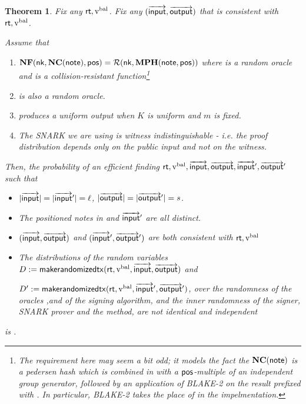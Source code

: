 \documentclass[11pt]{article}
\numberwithin{equation}{section} %
\numberwithin{figure}{section} %
\newtheorem{thm}{Theorem}[section]
\begin{document}
\begin{thm}\label{thm:indist-sapling}
Fix any $\mathsf{rt},\mathrm{v^{bal}}$.
Fix any $(\overrightarrow{\mathsf{input}},\overrightarrow{\mathsf{output}})$ that is consistent with $\mathsf{rt},\mathrm{v^{bal}}$.

Assume that 
\begin{enumerate}
 \item 
$\mathbf{NF}(\mathsf{nk},\mathbf{NC}(\mathsf{note}),\mathsf{pos})= \mathcal R(\mathsf{nk},\mathbf{MPH}(\mathsf{note},\mathsf{pos}))$ where \RO is a random oracle and \MPH is a collision-resistant function\footnote{The requirement here may seem a bit odd; it models the fact the $\mathbf{NC}(\mathsf{note})$ is a pedersen hash which is combined in \NF with a $\mathsf{pos}$-multiple of an independent group generator, followed by an application of BLAKE-2 on the result prefixed with \nk. In particular, BLAKE-2 takes the place of \RO in the impelmentation.}

\item
\KDF is also a random oracle.
\item {} produces a uniform output when $K$ is uniform and $m$ is fixed.
\item The SNARK we are using is witness indistinguishable - i.e. the proof distribution depends \emph{only} on the public input and not on the witness.
\end{enumerate}


Then, the probability of an efficient \adv finding $\mathsf{rt},\mathrm{v^{bal}},\overrightarrow{\mathsf{input}},\overrightarrow{\mathsf{output}},\overrightarrow{\mathsf{input}}',\overrightarrow{\mathsf{output}}'$
such that
\begin{itemize}
 \item 
$|\overrightarrow{\mathsf{input}}|=|\overrightarrow{\mathsf{input}}'| = \ell$, $|\overrightarrow{\mathsf{output}}|=|\overrightarrow{\mathsf{output}}'| =s $. 
\item The positioned notes in  and $\overrightarrow{\mathsf{input}}'$ are all distinct.
\item $(\overrightarrow{\mathsf{input}},\overrightarrow{\mathsf{output}})$ and $(\overrightarrow{\mathsf{input}}',\overrightarrow{\mathsf{output}}')$ are both consistent with $\mathsf{rt},\mathrm{v^{bal}}$
\item The distributions of the random variables $D:= \mathsf{makerandomizedtx}(\mathsf{rt},\mathrm{v^{bal}},\overrightarrow{\mathsf{input}},\overrightarrow{\mathsf{output}})$ and 

$D':= \mathsf{makerandomizedtx}(\mathsf{rt},\mathrm{v^{bal}},\overrightarrow{\mathsf{input}}',\overrightarrow{\mathsf{output}}')$,
over the randomness of the oracles \RO,\KDF and \ROsig of the signing algorithm, and the inner randomness of the signer, SNARK prover and the \makerandomizedtx method,
are not identical and independent
\end{itemize}
is \negl.

\end{thm}
\end{document}
